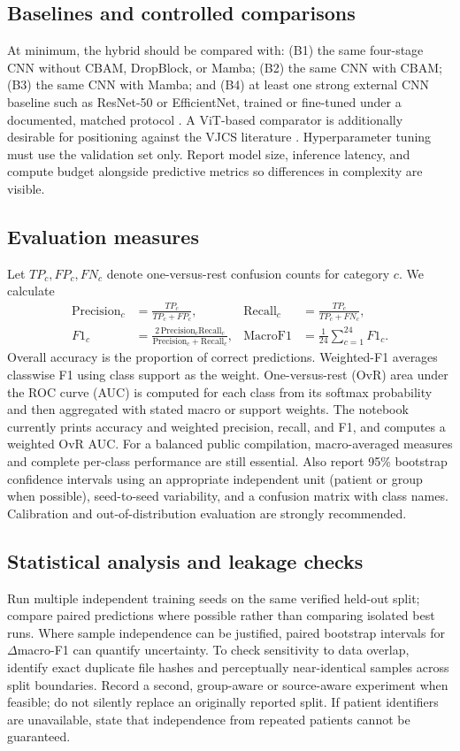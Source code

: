 \documentclass[11pt,a4paper]{article}
\begin{document}
\subsection{Baselines and controlled comparisons}
At minimum, the hybrid should be compared with: (B1) the same four-stage CNN without CBAM, DropBlock, or Mamba; (B2) the same CNN with CBAM; (B3) the same CNN with Mamba; and (B4) at least one strong external CNN baseline such as ResNet-50 or EfficientNet, trained or fine-tuned under a documented, matched protocol \citep{he2016resnet,tan2019efficientnet}. A ViT-based comparator is additionally desirable for positioning against the VJCS literature \citep{dosovitskiy2021vit,luong2025breast}. Hyperparameter tuning must use the validation set only. Report model size, inference latency, and compute budget alongside predictive metrics so differences in complexity are visible.

\subsection{Evaluation measures}\label{subsec:metrics}
Let $TP_c,FP_c,FN_c$ denote one-versus-rest confusion counts for category $c$. We calculate
\begin{align}
\mathrm{Precision}_c &= \frac{TP_c}{TP_c+FP_c}, &
\mathrm{Recall}_c &= \frac{TP_c}{TP_c+FN_c},\\
F1_c &= \frac{2\,\mathrm{Precision}_c\mathrm{Recall}_c}{\mathrm{Precision}_c+\mathrm{Recall}_c}, &
\mathrm{MacroF1} &= \frac{1}{24}\sum_{c=1}^{24}F1_c.
\end{align}
Overall accuracy is the proportion of correct predictions. Weighted-F1 averages classwise F1 using class support as the weight. One-versus-rest (OvR) area under the ROC curve (AUC) is computed for each class from its softmax probability and then aggregated with stated macro or support weights. The notebook currently prints accuracy and weighted precision, recall, and F1, and computes a weighted OvR AUC. For a balanced public compilation, macro-averaged measures and complete per-class performance are still essential. Also report 95\% bootstrap confidence intervals using an appropriate independent unit (patient or group when possible), seed-to-seed variability, and a confusion matrix with class names. Calibration and out-of-distribution evaluation are strongly recommended.

\subsection{Statistical analysis and leakage checks}
Run multiple independent training seeds on the same verified held-out split; compare paired predictions where possible rather than comparing isolated best runs. Where sample independence can be justified, paired bootstrap intervals for $\Delta$macro-F1 can quantify uncertainty. To check sensitivity to data overlap, identify exact duplicate file hashes and perceptually near-identical samples across split boundaries. Record a second, group-aware or source-aware experiment when feasible; do not silently replace an originally reported split. If patient identifiers are unavailable, state that independence from repeated patients cannot be guaranteed.
\end{document}
